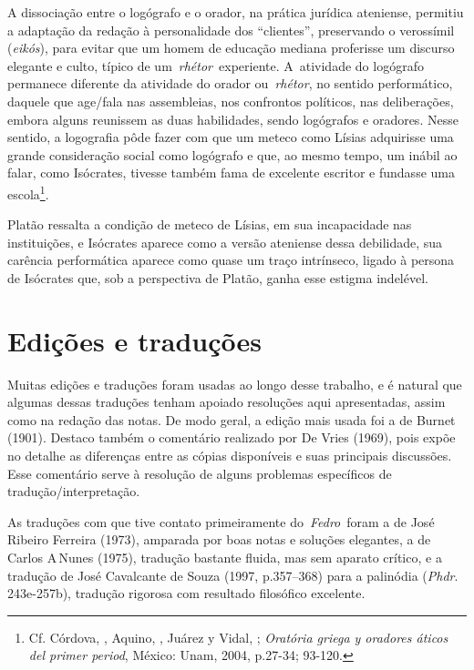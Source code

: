 A dissociação entre o logógrafo e o orador, na prática jurídica
ateniense, permitiu a adaptação da redação à personalidade dos
``clientes'', preservando o verossímil (\emph{eikós}), para evitar que
um homem de educação mediana proferisse um discurso elegante e culto,
típico de um~\emph{rhétor}~experiente. A~atividade do logógrafo
permanece diferente da atividade do orador ou~\emph{rhétor}, no sentido
performático, daquele que age/\allowbreak{}fala nas assembleias, nos confrontos
políticos, nas deliberações, embora alguns reunissem as duas
habilidades, sendo logógrafos e oradores. Nesse sentido, a logografia
pôde fazer com que um meteco como Lísias adquirisse uma grande
consideração social como logógrafo e que, ao mesmo tempo, um inábil ao
falar, como Isócrates, tivesse também fama de excelente escritor e
fundasse uma escola\footnote{Cf. Córdova, , Aquino, , Juárez  y Vidal, ; \emph{Oratória griega y oradores áticos del primer
  period}, México: Unam, 2004, p.27-34; 93-120.}.

Platão ressalta a condição de meteco de Lísias, em sua incapacidade nas
instituições, e Isócrates aparece como a versão ateniense dessa
debilidade, sua carência performática aparece como quase um traço
intrínseco, ligado à persona de Isócrates que, sob a perspectiva de
Platão, ganha esse estigma indelével.

 

\section{Edições e traduções}

 

Muitas edições e traduções foram usadas ao longo desse trabalho, e é
natural que algumas dessas traduções tenham apoiado resoluções aqui
apresentadas, assim como na redação das notas. De modo geral, a edição
mais usada foi a de Burnet (1901). Destaco também o comentário realizado
por De Vries (1969), pois expõe no detalhe as diferenças entre as cópias
disponíveis e suas principais discussões. Esse comentário serve à
resolução de alguns problemas específicos de tradução/\allowbreak{}interpretação.

As traduções com que tive contato primeiramente do~\emph{Fedro}~foram a de
José Ribeiro Ferreira (1973), amparada por boas notas e soluções
elegantes, a de Carlos A\,Nunes (1975), tradução bastante fluida, mas
sem aparato crítico, e a tradução de José Cavalcante de Souza (1997,
p.357--368) para a palinódia (\emph{Phdr}. 243e-257b), tradução rigorosa
com resultado filosófico excelente.

